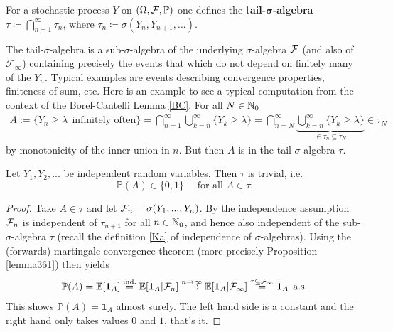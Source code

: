 \begin{ldef}
\begin{deff}\label{tail_sigma_algebra}
	For a stochastic process $Y$ on $(\Omega, \mathcal F, \P)$ one defines the \textbf{tail-}$\mathbf{\sigma}$\textbf{-algebra} $\tau \coloneqq \bigcap\limits_{n=1}^{\infty}\tau_n$, where $\tau_n \coloneqq \sigma(Y_n,Y_{n+1},...)$.
\end{deff}
\end{ldef}
	The tail-$\sigma$-algebra is a sub-$\sigma$-algebra of the underlying $\sigma$-algebra $\cF$ (and also of $\mathcal F_\infty$) containing precisely the events that which do not depend on finitely many of the $Y_n$. Typical examples are events describing convergence properties, finiteness of sum, etc. Here is an example to see a typical computation from the context of the Borel-Cantelli Lemma \ref{BC}. For all $N\in \N_0$
	\begin{align*}
		A := \{ Y_n \geq \lambda \:\:\text{infinitely often}\} = \bigcap\limits_{n=1}^{\infty}\bigcup\limits_{k=n}^{\infty}\{Y_k \geq \lambda \}=\bigcap\limits_{n=N}^{\infty}\underbrace{\bigcup\limits_{k=n}^{\infty}\{Y_k \geq \lambda \}}_{\in\tau_n\subseteq \tau_N}\in \tau_N
	\end{align*}
	by monotonicity of the inner union in $n$. But then $A$ is in the tail-$\sigma$-algebra $\tau$.
\begin{lsatzwichtig}
\begin{theorem}\label{kolmogorov_0_1_law}
	Let $Y_1,Y_2,...$ be independent random variables. Then $\tau$ is trivial, i.e. $$\mathbb{P}(A)\in\{0,1\} \quad\text{ for all }  A\in \tau .$$
\end{theorem}
\end{lsatzwichtig}
\begin{proof}[Proof]
	Take $A\in\tau$ and let $\cF_n = \sigma(Y_1,...,Y_n)$. By the independence assumption $\cF_n$ is independent of $\tau_{n+1}$ for all $n\in\N_0$, and hence also independent of the sub-$\sigma$-algebra $\tau$ (recall the definition \ref{Ka} of independence of $\sigma$-algebras). Using the (forwards) martingale convergence theorem (more precisely Proposition \ref{lemma361}) then yields
	\begin{align*}
	 	\mathbb{P}(A) = \E[\mathbf 1_A] \overset{\text{ind.}}{=} \E[\mathbf 1_A |\cF_n]  \overset{n\to\infty}{\longrightarrow} \E[\mathbf 1_A|\cF_{\infty}] \overset{\tau\subseteq \mathcal F_\infty}{=} \mathbf 1_A \:\: \text{a.s.}
	\end{align*}
	This shows $\mathbb{P}(A) = \mathbf 1_A$ almost surely. The left hand side is a constant and the right hand only takes values $0$ and $1$, that's it.
	\end{proof}
